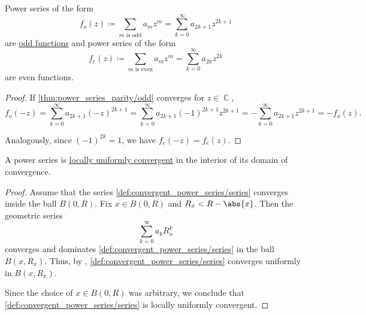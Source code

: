 \begin{proposition}\label{thm:power_series_parity}
  Power series of the form
  \begin{equation}\label{thm:power_series_parity/odd}
    f_o(z) \coloneqq \sum_{m \text{ is odd}} a_m z^m = \sum_{k=0}^\infty a_{2k+1} z^{2k+1}
  \end{equation}
  are \hyperref[def:real_function_parity]{odd functions} and power series of the form
  \begin{equation}\label{thm:power_series_parity/even}
    f_e(z) \coloneqq \sum_{m \text{ is even}} a_m z^m = \sum_{k=0}^\infty a_{2k} z^{2k}
  \end{equation}
  are even functions.
\end{proposition}
\begin{proof}
  If \eqref{thm:power_series_parity/odd} converges for \( z \in \BbbC \),
  \begin{equation*}
    f_o(-z)
    =
    \sum_{k=0}^\infty a_{2k+1} (-z)^{2k+1}
    =
    \sum_{k=0}^\infty a_{2k+1} (-1)^{2k+1} z^{2k+1}
    =
    - \sum_{k=0}^\infty a_{2k+1} z^{2k+1}
    =
    - f_o(z).
  \end{equation*}

  Analogously, since \( (-1)^{2k} = 1 \), we have \( f_e(-z) = f_e(z) \).
\end{proof}

\begin{proposition}\label{thm:power_series_are_locally_uniform_convergent}
  A power series is \hyperref[def:function_net_convergence/locally_uniform]{locally uniformly convergent} in the interior of its domain of convergence.
\end{proposition}
\begin{proof}
  Assume that the series \eqref{def:convergent_power_series/series} converges inside the ball \( B(0, R) \). Fix \( x \in B(0, R) \) and \( R_x < R - \abs{x} \). Then the geometric series
  \begin{equation*}
    \sum_{k=0}^\infty a_k R_x^k
  \end{equation*}
  converges and dominates \eqref{def:convergent_power_series/series} in the ball \( B(x, R_x) \). Thus, by , \eqref{def:convergent_power_series/series} converges uniformly in \( B(x, R_x) \).

  Since the choice of \( x \in B(0, R) \) was arbitrary, we conclude that \eqref{def:convergent_power_series/series} is locally uniformly convergent.
\end{proof}

